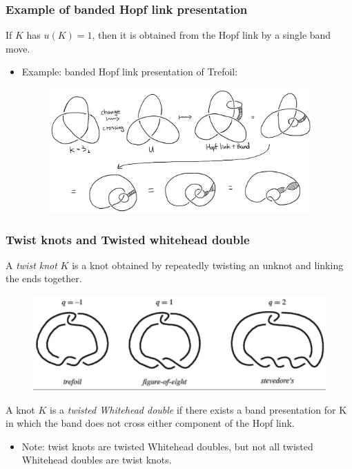 \documentclass{beamer}
\theoremstyle{ex}
\theoremstyle{rem}
\begin{document}
\begin{frame}
	\frametitle{Example of banded Hopf link presentation}
	\begin{theorem}
		If $K$ has $u(K)=1$, then it is obtained from the Hopf link by a single band move. 
	\end{theorem}
	\begin{itemize}
		\item Example: banded Hopf link presentation of Trefoil:
		\begin{figure}
			\begin{center}{\includegraphics [width=10cm] {trefoil}}\end{center}
		\end{figure}
	\end{itemize}
\end{frame}

	\begin{frame}
		\frametitle{Twist knots and Twisted whitehead double}
		\begin{definition}
			A \textit{twist knot} $K$ is a knot obtained by repeatedly twisting an unknot and linking the ends together.
		\end{definition}
			\begin{figure}
				{\includegraphics[scale=0.6] {twistknot}}
			\end{figure}
		\begin{definition}
			A knot $K$ is a \textit{twisted Whitehead double} if there exists a band presentation for K in which the band does not cross either component of the Hopf link. 
		\end{definition}
		\begin{itemize}
			\item Note: twist knots are twisted Whitehead doubles, but not all twisted Whitehead doubles are twist knots.
		\end{itemize}
	\end{frame}
\end{document}
